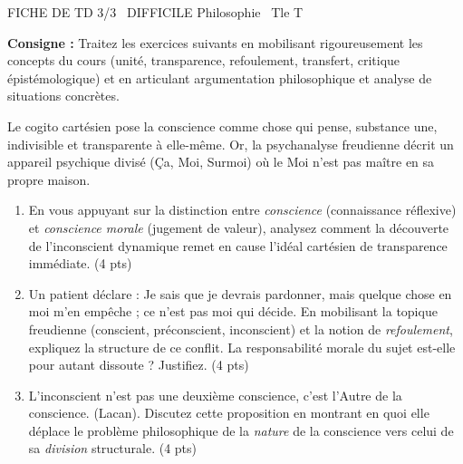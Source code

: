 \documentclass[11pt]{article}
\begin{document}
\begin{tcolorbox}[enhanced,colback=popink,colframe=popink,arc=10pt,boxrule=0pt,left=12pt,right=12pt,top=9pt,bottom=9pt]
{\color{white}\popxbold\small FICHE DE TD 3/3 \textbullet\ DIFFICILE \hfill Philosophie \textbullet\ Tle T\par}
\end{tcolorbox}
\vspace{4pt}
\noindent \textbf{Consigne :} Traitez les exercices suivants en mobilisant rigoureusement les concepts du cours (unité, transparence, refoulement, transfert, critique épistémologique) et en articulant argumentation philosophique et analyse de situations concrètes.

\begin{exercice}
Le cogito cartésien pose la conscience comme \og chose qui pense\fg{}, substance une, indivisible et transparente à elle-même. Or, la psychanalyse freudienne décrit un appareil psychique divisé (Ça, Moi, Surmoi) où le Moi \og n'est pas maître en sa propre maison\fg{}.
\begin{enumerate}
    \item En vous appuyant sur la distinction entre \textit{conscience} (connaissance réflexive) et \textit{conscience morale} (jugement de valeur), analysez comment la découverte de l'inconscient dynamique remet en cause l'idéal cartésien de transparence immédiate. (4 pts)
    \item Un patient déclare : \og Je sais que je devrais pardonner, mais quelque chose en moi m'en empêche ; ce n'est pas moi qui décide.\fg{} En mobilisant la topique freudienne (conscient, préconscient, inconscient) et la notion de \textit{refoulement}, expliquez la structure de ce conflit. La responsabilité morale du sujet est-elle pour autant dissoute ? Justifiez. (4 pts)
    \item \og L'inconscient n'est pas une deuxième conscience, c'est l'Autre de la conscience.\fg{} (Lacan). Discutez cette proposition en montrant en quoi elle déplace le problème philosophique de la \textit{nature} de la conscience vers celui de sa \textit{division} structurale. (4 pts)
\end{enumerate}
\end{exercice}
\end{document}
